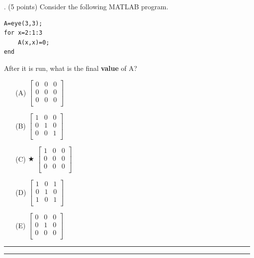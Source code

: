 \documentclass{article}
\begin{document}
\newpage
{}. (5 points)
Consider the following MATLAB program.
\begin{verbatim}
A=eye(3,3);
for x=2:1:3
    A(x,x)=0;
end
\end{verbatim}
After it is run, what is the final \textbf{value} of A?


\begin{enumerate}
\item[(A)]
$ \left[ \begin{array}{ccc} 0 & 0 & 0 \\ 0 & 0 & 0 \\ 0 & 0 & 0 \\ \end{array} \right] $

\item[(B)]
$ \left[ \begin{array}{ccc} 1 & 0 & 0 \\ 0 & 1 & 0 \\ 0 & 0 & 1 \\ \end{array} \right] $

\item[(C)] $\bigstar$ 
$ \left[ \begin{array}{ccc} 1 & 0 & 0 \\ 0 & 0 & 0 \\ 0 & 0 & 0 \\ \end{array} \right] $

\item[(D)]
$ \left[ \begin{array}{ccc} 1 & 0 & 1 \\ 0 & 1 & 0 \\ 1 & 0 & 1 \\ \end{array} \right] $

\item[(E)]
$ \left[ \begin{array}{ccc} 0 & 0 & 0 \\ 0 & 1 & 0 \\ 0 & 0 & 0 \\ \end{array} \right] $

\end{enumerate}

\vspace*{2em}
\hrule
\vspace{2em}

\vspace{2em}
\hrule height 2pt
\end{document}

